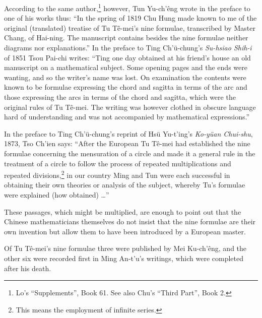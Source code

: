 \documentclass[11pt]{article}
\newcommand{\scanpage}[2]{\clearpage\setcounter{footnote}{0}\noindent{\footnotesize\color{gray}PDF page #1 · #2}\par\medskip}
\newcommand{\scanfooter}{}
\begin{document}
According to the same author,\footnote{Lo's ``Supplements'', Book 61. See also Chu's ``Third Part'', Book 2.} however, Tun Yu-ch'êng wrote in the preface to one of his works thus: ``In the spring of 1819 Chu Hung made known to me of the original (translated) treatise of Tu Tê-mei's nine formulae, transcribed by Master Chang, of Hai-ning. The manuscript contains besides the nine formulae neither diagrams nor explanations.'' In the preface to Ting Ch'ü-chung's \emph{Su-hsiao Shih-i} of 1851 Tsou Pai-chi writes: ``Ting one day obtained at his friend's house an old manuscript on a mathematical subject. Some opening pages and the ends were wanting, and so the writer's name was lost. On examination the contents were known to be formulae expressing the chord and sagitta in terms of the arc and those expressing the arcs in terms of the chord and sagitta, which were the original rules of Tu Tê-mei. The writing was however clothed in obscure language hard of understanding and was not accompanied by mathematical expressions.''

In the preface to Ting Ch'ü-chung's reprint of Hsü Yu-t'ing's \emph{Ko-yüan Chui-shu}, 1873, Tso Ch'ien says: ``After the European Tu Tê-mei had established the nine formulae concerning the mensuration of a circle and made it a general rule in the treatment of a circle to follow the process of repeated multiplications and repeated divisions,\footnote{This means the employment of infinite series.} in our country Ming and Tun were each successful in obtaining their own theories or analysis of the subject, whereby Tu's formulae were explained (how obtained) \ldots{}''

These passages, which might be multiplied, are enough to point out that the Chinese mathematicians themselves do not insist that the nine formulae are their own invention but allow them to have been introduced by a European master.
\scanfooter

\scanpage{0159}{Chapter 21, printed page 145}
Of Tu Tê-mei's nine formulae three were published by Mei Ku-ch'êng, and the other six were recorded first in Ming An-t'u's writings, which were completed after his death.
\end{document}
